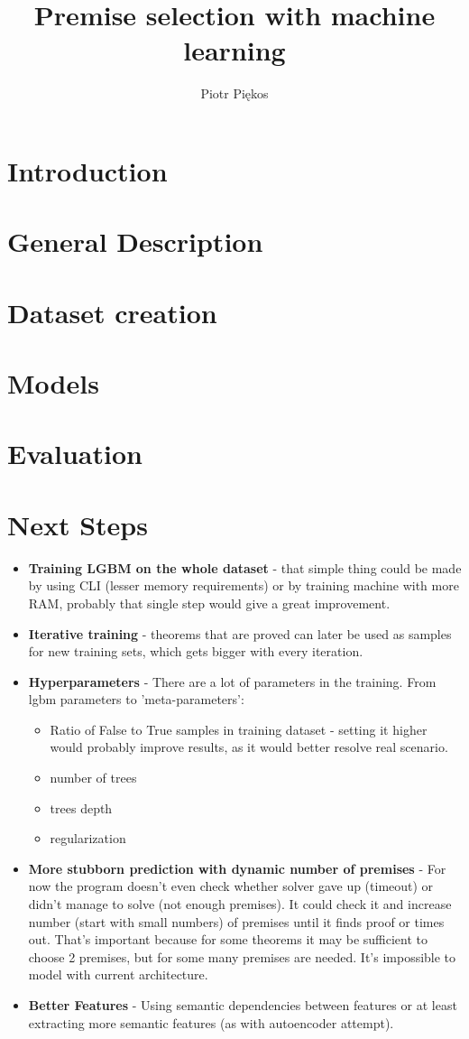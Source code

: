 \documentclass{article} %
\author{Piotr Piękos}
\title{%
Premise selection with machine learning}
\begin{document}
\maketitle

\section{Introduction}
\section{General Description}
\section{Dataset creation}
\section{Models}
\section{Evaluation}
\section{Next Steps}
\begin{itemize}
\item \textbf{Training LGBM on the whole dataset} - that simple thing could be made by using CLI (lesser memory requirements) or by training machine with more RAM, probably that single step would give a great improvement.
\item \textbf{Iterative training} - theorems that are proved can later be used as samples for new training sets, which gets bigger with every iteration.
\item \textbf{Hyperparameters} - There are a lot of parameters in the training. From lgbm parameters to 'meta-parameters': \begin{itemize}
	\item Ratio of False to True samples in training dataset - setting it higher would probably improve results, as it would better resolve real scenario.
	\item number of trees
	\item trees depth
	\item regularization
	\end{itemize}
\item \textbf{More stubborn prediction with dynamic number of premises} - For now the program doesn't even check whether solver gave up (timeout) or didn't manage to solve (not enough premises). It could check it and increase number (start with small numbers) of premises until it finds proof or times out. That's important because for some theorems it may be sufficient to choose 2 premises, but for some many premises are needed. It's impossible to model with current architecture.
\item \textbf{Better Features} - Using semantic dependencies between features or at least extracting more semantic features (as with autoencoder attempt).


\end{itemize}
\end{document}
